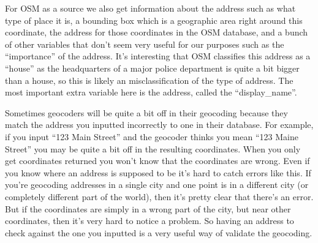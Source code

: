 \documentclass[
]{krantz}
\makeatletter
\newenvironment{Shaded}{\begin{snugshade}}{\end{snugshade}}
\newcommand{\AttributeTok}[1]{\textcolor[rgb]{0.61,0.61,0.61}{#1}}
\newcommand{\CommentTok}[1]{\textcolor[rgb]{0.37,0.37,0.37}{\textit{#1}}}
\newcommand{\ConstantTok}[1]{\textcolor[rgb]{0,0,0}{#1}}
\newcommand{\FunctionTok}[1]{\textcolor[rgb]{0,0,0}{#1}}
\newcommand{\NormalTok}[1]{#1}
\newcommand{\OtherTok}[1]{\textcolor[rgb]{0.37,0.37,0.37}{#1}}
\newcommand{\SpecialCharTok}[1]{\textcolor[rgb]{0,0,0}{#1}}
\newcommand{\StringTok}[1]{\textcolor[rgb]{0.5,0.5,0.5}{#1}}
\newenvironment{kframe}{%
\medskip{}
\setlength{\fboxsep}{.8em}
 \def\at@end@of@kframe{}%
 \ifinner\ifhmode%
  \def\at@end@of@kframe{\end{minipage}}%
  \begin{minipage}{\columnwidth}%
 \fi\fi%
 \def\FrameCommand##1{\hskip\@totalleftmargin \hskip-\fboxsep
 \colorbox{shadecolor}{##1}\hskip-\fboxsep
     \hskip-\linewidth \hskip-\@totalleftmargin \hskip\columnwidth}%
 \MakeFramed {\advance\hsize-\width
   \@totalleftmargin\z@ \linewidth\hsize
   \@setminipage}}%
 {\par\unskip\endMakeFramed%
 \at@end@of@kframe}
\renewenvironment{Shaded}{\begin{kframe}}{\end{kframe}}
\makeatother
\begin{document}
\begin{Shaded}
\end{Shaded}

For OSM as a source we also get information about the
address such as what type of place it is, a bounding box
which is a geographic area right around this coordinate, the
address for those coordinates in the OSM database, and a
bunch of other variables that don't seem very useful for our
purposes such as the ``importance'' of the address. It's
interesting that OSM classifies this address as a ``house''
as the headquarters of a major police department is quite a
bit bigger than a house, so this is likely an
misclassification of the type of address. The most important
extra variable here is the address, called the
``display\_name''.

Sometimes geocoders will be quite a bit off in their
geocoding because they match the address you inputted
incorrectly to one in their database. For example, if you
input ``123 Main Street'' and the geocoder thinks you mean
``123 Maine Street'' you may be quite a bit off in the
resulting coordinates. When you only get coordinates
returned you won't know that the coordinates are wrong. Even
if you know where an address is supposed to be it's hard to
catch errors like this. If you're geocoding addresses in a
single city and one point is in a different city (or
completely different part of the world), then it's pretty
clear that there's an error. But if the coordinates are
simply in a wrong part of the city, but near other
coordinates, then it's very hard to notice a problem. So
having an address to check against the one you inputted is a
very useful way of validate the geocoding.
\end{document}
